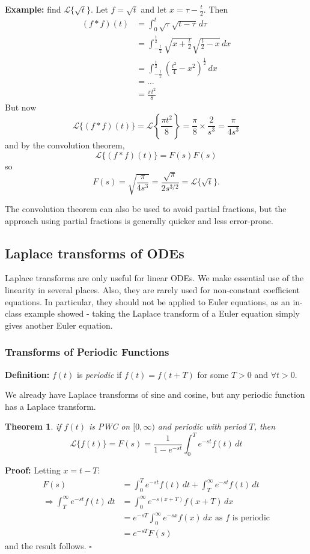 \documentclass[11pt]{article}
\newtheorem{thm}{Theorem}[section]
\newcommand{\example}{\textbf{Example: }}
\newcommand{\definition}{\textbf{Definition: }}
\newcommand{\lap}{\mathcal{L}}
\newcommand{\intzi}{\int_0^{\infty}}
\newcommand{\lapft}{\lap\{f(t)\}}
\begin{document}
	\example find $\lap\{\sqrt{t}\}$. Let $f=\sqrt{t}$ and let $x = \tau - \frac{t}{2}$. Then
		\begin{align*}
			(f*f)(t) &= \int_0^t \sqrt{\tau} \sqrt{t-\tau} \, d\tau \\
				&= \int_{-\frac{t}{2}}^{\frac{t}{2}} \sqrt{x + \frac{t}{2}} \sqrt{\frac{t}{2} - x} \,dx \\
				&= \int_{-\frac{t}{2}}^{\frac{t}{2}} \left(\frac{t^2}{4} - x^2 \right)^{\frac{1}{2}} \, dx \\
				&= \ldots \\
				&= \frac{\pi t^2}{8}
		\end{align*}
	But now
		\[
			\lap\{(f*f)(t)\} = \lap \left\{\frac{\pi t^2}{8} \right\} = \frac{\pi}{8} \times \frac{2}{s^3} = \frac{\pi}{4s^3}
		\]
	and by the convolution theorem,
		$$ \lap\{(f*f)(t)\} = F(s) F(s) $$
	so
		$$ F(s) = \sqrt{\frac{\pi}{4s^3}} = \frac{\sqrt{\pi}}{2 s^{3/2}} = \lap\{\sqrt{t}\}. $$

	The convolution theorem can also be used to avoid partial fractions, but the approach using partial fractions is generally quicker and less error-prone.

\subsection{Laplace transforms of ODEs}
	Laplace transforms are only useful for linear ODEs. We make essential use of the linearity in several places. Also, they are rarely used for non-constant coefficient equations. In particular, they should not be applied to Euler equations, as an in-class example showed - taking the Laplace transform of a Euler equation simply gives another Euler equation.

\subsubsection{Transforms of Periodic Functions}
	\definition $f(t)$ is \emph{periodic} if $f(t) = f(t + T)$ for some $T>0$ and $\forall t > 0$.

	We already have Laplace transforms of sine and cosine, but any periodic function has a Laplace transform.

	\begin{thm}
		if $f(t)$ is PWC on $[0,\infty)$ and periodic with period $T$, then
			$$ \lapft = F(s) = \frac{1}{1 - e^{-st}} \int_0^T e^{-st} f(t) \,dt $$
	\end{thm}

	\textbf{Proof:} Letting $x = t-T$:
		\begin{align*}
			F(s) &= \int_0^T e^{-st} f(t) \,dt + \int_T^{\infty} e^{-st} f(t) \,dt \\
			\Rightarrow \int_T^{\infty} e^{-st} f(t) \,dt &= \intzi e^{-s(x+T)} f(x+T) \,dx \\
				&= e^{-sT} \intzi e^{-sx} f(x) \, dx \text{ as $f$ is periodic} \\
				&= e^{-sT} F(s)
		\end{align*}
	and the result follows. $\square$
\end{document}
